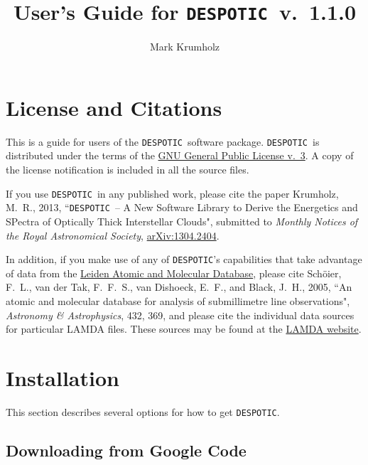 \documentclass[12pt]{article}
\newcommand{\despotic}{\texttt{DESPOTIC}}
\begin{document}
\title{User's Guide for \despotic\ v.~1.1.0}
\author{Mark Krumholz}

\maketitle

\tableofcontents

\clearpage

\section{License and Citations}

This is a guide for users of the \despotic\ software package. \despotic\ is distributed under the terms of the \href{http://http://www.gnu.org/licenses/gpl.html}{GNU General Public License v.~3}. A copy of the license notification is included in all the source files.

If you use \despotic\ in any published work, please cite the paper Krumholz, M.~R., 2013, ``\despotic\ -- A New Software Library to Derive the Energetics and SPectra of Optically Thick Interstellar Clouds", submitted to \textit{Monthly Notices of the Royal Astronomical Society}, \href{http://arxiv.org/abs/1304.2404}{arXiv:1304.2404}.

In addition, if you make use of any of \despotic's capabilities that take advantage of data from the \href{http://home.strw.leidenuniv.nl/~moldata/}{Leiden Atomic and Molecular Database}, please cite Sch\"oier, F.~L., van der Tak, F.~F.~S., van Dishoeck, E.~F., and Black, J.~H., 2005, ``An atomic and molecular database for analysis of submillimetre line observations", \textit{Astronomy \& Astrophysics}, 432, 369, and please cite the individual data sources for particular LAMDA files. These sources may be found at the \href{http://home.strw.leidenuniv.nl/~moldata/}{LAMDA website}.

\clearpage


\section{Installation}

This section describes several options for how to get \despotic.

\subsection{Downloading from Google Code}
\end{document}
